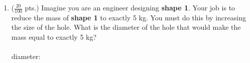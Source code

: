 \documentclass[11pt]{article}
\begin{document}
\begin{description}
\begin{enumerate}
{\textbf mass: \underline{\hspace{60mm}}}\\

\newpage	
            \item ($\frac{20}{100}$ pts.) Imagine you are an engineer designing {\bf shape 1}. Your job is to reduce the mass of {\bf shape 1} to exactly 5 kg. You must do this by increasing the size of the hole. What is the diameter of the hole that would make the mass equal to exactly 5 kg?\\
		\vspace{5mm}\\
		diameter: \underline{\hspace{50mm}}
        	\end{enumerate}

\underline{\hspace{140mm}}\\\\
\underline{\hspace{140mm}}\\\\
\underline{\hspace{140mm}}\\\\
\underline{\hspace{140mm}}\\\\
\underline{\hspace{140mm}}\\\\
\underline{\hspace{140mm}}\\\\
\underline{\hspace{140mm}}\\\\
\underline{\hspace{140mm}}\\\\
\underline{\hspace{140mm}}\\\\
\underline{\hspace{140mm}}\\\\
\underline{\hspace{140mm}}\\\\
\underline{\hspace{140mm}}\\\\

\end{description}
\end{document}

